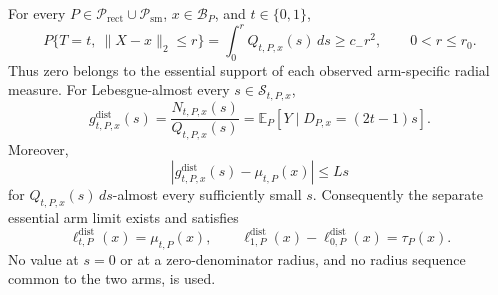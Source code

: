 For every \(P\in\mathcal P_{\mathrm{rect}}\cup\mathcal P_{\mathrm{sm}}\), \(x\in\mathcal B_P\), and \(t\in\{0,1\}\),
\[
 P\{T=t,\ \lVert X-x\rVert_2\leq r\}
 =\int_0^rQ_{t,P,x}(s)\,ds
 \geq c_-r^2,
 \qquad 0<r\leq r_0.
\]
Thus zero belongs to the essential support of each observed arm-specific radial measure.  For Lebesgue-almost every \(s\in\mathcal S_{t,P,x}\),
\[
 g^{\mathrm{dist}}_{t,P,x}(s)
 =\frac{N_{t,P,x}(s)}{Q_{t,P,x}(s)}
 =\mathbb E_P[Y\mid D_{P,x}=(2t-1)s].
\]
Moreover,
\[
 |g^{\mathrm{dist}}_{t,P,x}(s)-\mu_{t,P}(x)|\leq Ls
\]
for \(Q_{t,P,x}(s)\,ds\)-almost every sufficiently small \(s\).  Consequently the separate essential arm limit exists and satisfies
\[
 \ell^{\mathrm{dist}}_{t,P}(x)=\mu_{t,P}(x),
 \qquad
 \ell^{\mathrm{dist}}_{1,P}(x)-\ell^{\mathrm{dist}}_{0,P}(x)=\tau_P(x).
\]
No value at \(s=0\) or at a zero-denominator radius, and no radius sequence common to the two arms, is used.